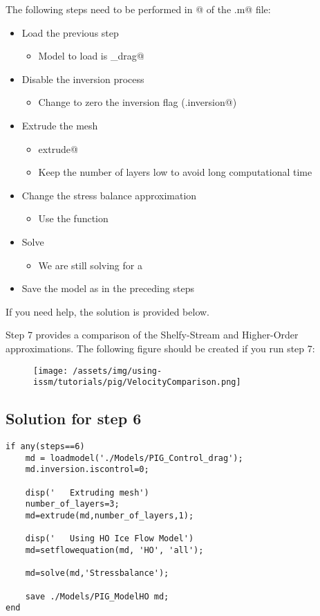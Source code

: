 The following steps need to be performed in @ of the \verb@runme.m@ file:
\begin{itemize}
	\item Load the previous step
		\begin{itemize}
			\item Model to load is \verb@Control_drag@
		\end{itemize}
	\item Disable the inversion process
		\begin{itemize}
			\item Change \verb@iscontrol@ to zero the inversion flag (\verb@md.inversion@)
		\end{itemize}
	\item Extrude the mesh
		\begin{itemize}
			\item \verb@help extrude@
			\item Keep the number of layers low to avoid long computational time
		\end{itemize}
	\item Change the stress balance approximation
		\begin{itemize}
			\item Use the function \verb@setflowequation@
		\end{itemize}
	\item Solve
		\begin{itemize}
			\item We are still solving for a \verb@StressBalanceSolution@
		\end{itemize}
	\item Save the model as in the preceding steps
\end{itemize}

If you need help, the solution is provided below.

Step 7 provides a comparison of the Shelfy-Stream and Higher-Order approximations. The following figure should be created if you run step 7:
\begin{figure}[H]
	\begin{center}
		\texttt{[image: /assets/img/using-issm/tutorials/pig/VelocityComparison.png]}
	\end{center}
\end{figure}
\subsection{Solution for step 6}%
\begin{verbatim}if any(steps==6)
	md = loadmodel('./Models/PIG_Control_drag');
	md.inversion.iscontrol=0;

	disp('   Extruding mesh')
	number_of_layers=3;
	md=extrude(md,number_of_layers,1);

	disp('   Using HO Ice Flow Model')
	md=setflowequation(md, 'HO', 'all');

	md=solve(md,'Stressbalance');

	save ./Models/PIG_ModelHO md;
end\end{verbatim}
